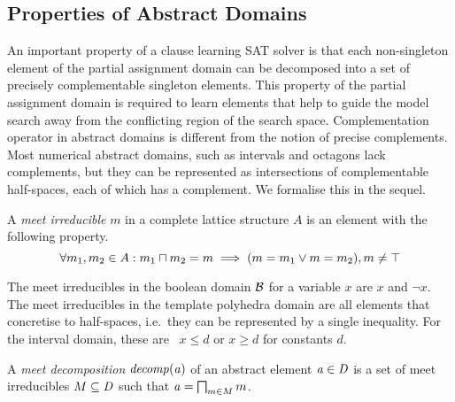 \subsection{Properties of Abstract Domains}
%
An important property of a clause learning SAT solver is that each
non-singleton element of the partial assignment domain can be 
decomposed into a set of precisely complementable singleton elements.  
This property of the partial assignment domain is required to learn 
elements that help to guide the model search away from the
conflicting region of the search space.  Complementation operator 
in abstract domains is different from the notion of precise complements. 
%
Most numerical abstract domains, such as intervals and octagons lack
complements, but they can be represented as intersections of
complementable half-spaces, each of which has a complement. 
%
We formalise this in the sequel.
%
\begin{definition} 
A \emph{meet irreducible} $m$ in a complete lattice 
structure $A$ is an element with the following property.
\begin{equation}
\forall m_1, m_2 \in A: m_1 \sqcap m_2 = m \implies (m = m_1 \lor m = m_2), m \neq \top  
\end{equation}

\end{definition}
%
The meet irreducibles in the boolean domain $\mathcal{B}$ for a variable $x$ are 
$x$ and $\neg x$. The meet 
irreducibles in the template polyhedra domain are all elements 
that concretise to half-spaces, i.e.\ they can be represented 
by a single inequality. For the interval domain, these are 
\ $x \leq d$ or $x \geq d$ for constants $d$. 


\begin{definition}
A \emph{meet decomposition} ${\mathit{decomp}}(\mathit{a})$ of an abstract
element $\mathit{a} \in \mathit{D}$ is a set of meet irreducibles $M \subseteq \mathit{D}$ such that 
$\mathit{a}=\bigsqcap_{m\in M} m$.
\end{definition}


